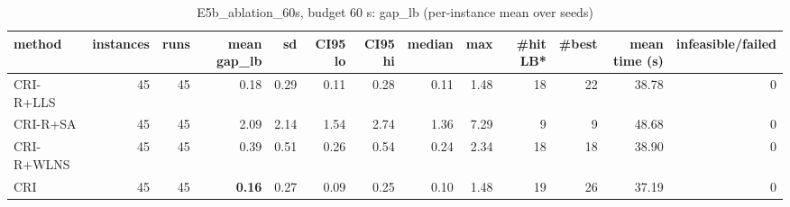 \begin{table}[htbp]
\centering
\small
\caption{E5b\_ablation\_60s, budget 60 s: gap\_lb (per-instance mean over seeds)}
\label{tab:E5b_ablation_60s_b60_summary}
\begin{tabular}{lrrrrrrrrrrrr}
\toprule
method & instances & runs & mean gap\_lb & sd & CI95 lo & CI95 hi & median & max & \#hit LB* & \#best & mean time (s) & infeasible/failed \\
\midrule
CRI-R+LLS & 45 & 45 & 0.18 & 0.29 & 0.11 & 0.28 & 0.11 & 1.48 & 18 & 22 & 38.78 & 0 \\
CRI-R+SA & 45 & 45 & 2.09 & 2.14 & 1.54 & 2.74 & 1.36 & 7.29 & 9 & 9 & 48.68 & 0 \\
CRI-R+WLNS & 45 & 45 & 0.39 & 0.51 & 0.26 & 0.54 & 0.24 & 2.34 & 18 & 18 & 38.90 & 0 \\
CRI & 45 & 45 & \textbf{0.16} & 0.27 & 0.09 & 0.25 & 0.10 & 1.48 & 19 & 26 & 37.19 & 0 \\
\bottomrule
\end{tabular}
\end{table}
